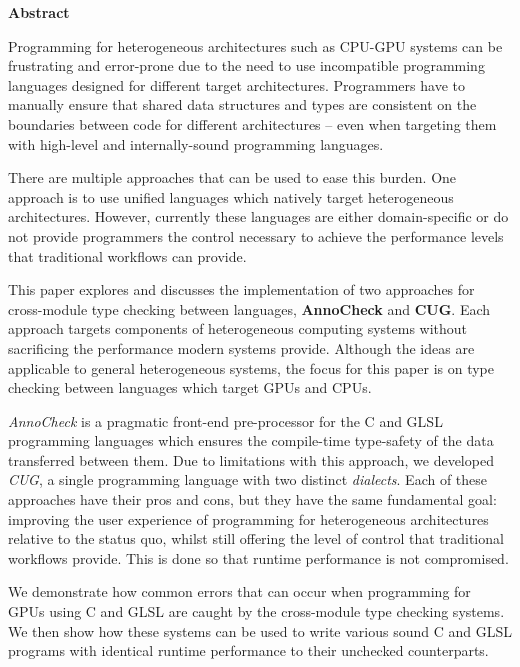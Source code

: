 \newpage
{\Huge \bf Abstract}
\vspace{24pt}






Programming for heterogeneous architectures such as CPU-GPU systems can be
frustrating and error-prone due to the need to use incompatible programming
languages designed for different target architectures. Programmers have to
manually ensure that shared data structures and types are consistent on the
boundaries between code for different architectures -- even when targeting them
with high-level and internally-sound programming languages.

There are multiple approaches that can be used to ease this burden. One
approach is to use unified languages which natively target heterogeneous
architectures. However, currently these languages are either domain-specific or
do not provide programmers the control necessary to achieve the performance
levels that traditional workflows can provide.

This paper explores and discusses the implementation of two approaches for
cross-module type checking between languages, \textbf{AnnoCheck} and
\textbf{CUG}. Each approach targets components of heterogeneous computing
systems without sacrificing the performance modern systems provide. Although
the ideas are applicable to general heterogeneous systems, the focus for this
paper is on type checking between languages which target GPUs and CPUs.

\textit{AnnoCheck} is a pragmatic front-end pre-processor for the C and GLSL
programming languages which ensures the compile-time type-safety of the data
transferred between them. Due to limitations with this approach, we developed
\textit{CUG}, a single programming language with two distinct
\textit{dialects}. Each of these approaches have their pros and cons, but they
have the same fundamental goal: improving the user experience of programming
for heterogeneous architectures relative to the status quo, whilst still
offering the level of control that traditional workflows provide. This is done
so that runtime performance is not compromised.

We demonstrate how common errors that can occur when programming for GPUs using
C and GLSL are caught by the cross-module type checking systems. We then show
how these systems can be used to write various sound C and GLSL programs with
identical runtime performance to their unchecked counterparts.

\newpage
\vspace*{\fill}
